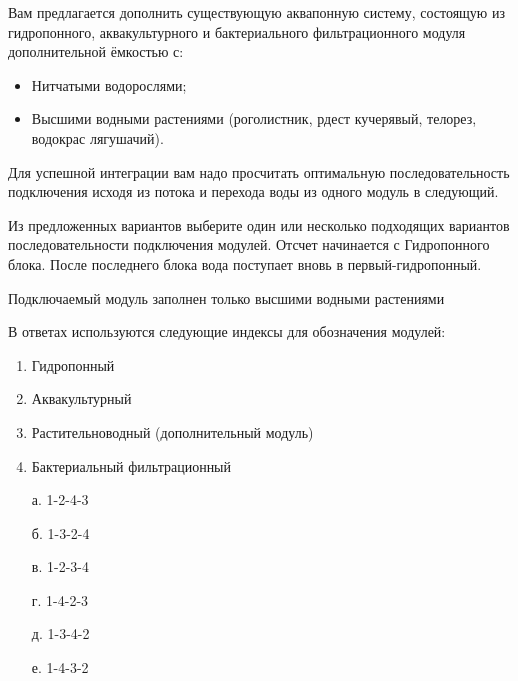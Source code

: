 
Вам предлагается дополнить существующую аквапонную систему, состоящую из гидропонного, аквакультурного и бактериального фильтрационного модуля дополнительной ёмкостью с:

\begin{itemize}
    \item Нитчатыми водорослями;
    \item Высшими водными растениями (роголистник, рдест кучерявый, телорез, водокрас лягушачий).
\end{itemize}

Для успешной интеграции вам надо просчитать оптимальную последовательность подключения исходя из потока и перехода воды из одного модуль в следующий.

Из предложенных вариантов выберите один или несколько подходящих вариантов последовательности подключения модулей. Отсчет начинается с Гидропонного блока. После последнего блока вода поступает вновь в первый-гидропонный.

Подключаемый модуль заполнен только высшими водными растениями

В ответах используются следующие индексы для обозначения модулей:

\begin{enumerate}
    \item Гидропонный
    \item Аквакультурный
    \item Растительноводный (дополнительный модуль)
    \item Бактериальный фильтрационный
\end{enumerate}

\begin{enumerate}
    \item[а.] 1-2-4-3
    \item[б.] 1-3-2-4
    \item[в.] 1-2-3-4
    \item[г.] 1-4-2-3
    \item[д.] 1-3-4-2
    \item[е.] 1-4-3-2
\end{enumerate}